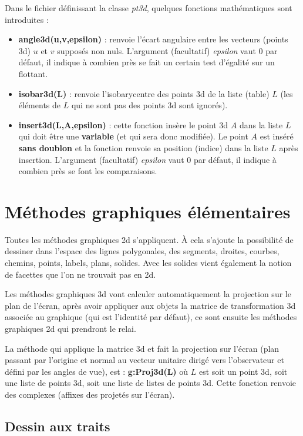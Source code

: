 \documentclass[%
10pt,%
a4paper,%
french,%
]%
{article}%
\begin{document}
Dans le fichier définissant la classe \emph{pt3d}, quelques fonctions mathématiques sont introduites :
\begin{itemize}
    \item \textbf{angle3d(u,v,epsilon)} : renvoie l'écart angulaire entre les vecteurs (points 3d) $u$ et $v$ supposés non nuls. L'argument (facultatif) \emph{epsilon} vaut $0$ par défaut, il indique à combien près se fait un certain test d'égalité sur un flottant.
    \item \textbf{isobar3d(L)} : renvoie l'isobarycentre des points 3d de la liste (table) $L$ (les éléments de $L$ qui ne sont pas des points 3d sont ignorés).
    \item \textbf{insert3d(L,A,epsilon)} : cette fonction insère le point 3d $A$ dans la liste $L$ qui doit être une \textbf{variable} (et qui sera donc modifiée). Le point $A$ est inséré \textbf{sans doublon} et la fonction renvoie sa position (indice) dans la liste $L$ après insertion. L'argument (facultatif) \emph{epsilon} vaut $0$ par défaut, il indique à combien près se font les comparaisons.
\end{itemize}

\section{Méthodes graphiques élémentaires}

Toutes les méthodes graphiques 2d s'appliquent. À cela s'ajoute la possibilité de dessiner dans l'espace des lignes polygonales, des segments, droites, courbes, chemins, points, labels, plans, solides. Avec les solides vient également la notion de facettes que l'on ne trouvait pas en 2d.

Les méthodes graphiques 3d vont calculer automatiquement la projection sur le plan de l'écran, après avoir appliquer aux objets la matrice de transformation 3d associée au graphique (qui est l'identité par défaut), ce sont ensuite les méthodes graphiques 2d qui prendront le relai.

La méthode qui applique la matrice 3d et fait la projection sur l'écran (plan passant par l'origine et normal au vecteur unitaire dirigé vers l'observateur et défini par les angles de vue), est : \textbf{g:Proj3d(L)} où $L$ est soit un point 3d, soit une liste de points 3d, soit une liste de listes de points 3d. Cette fonction renvoie des complexes (affixes des projetés sur l'écran).

\subsection{Dessin aux traits}
\end{document}
